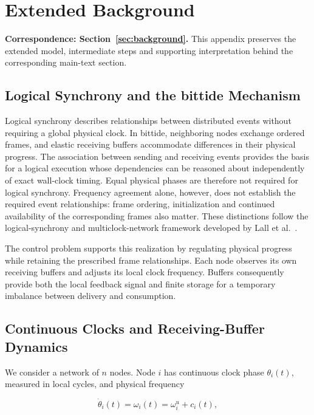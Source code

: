 \section{Extended Background}
\label{app:background}
\noindent\textbf{Correspondence: Section~\ref{sec:background}.} This appendix preserves the extended model, intermediate steps and supporting interpretation behind the corresponding main-text section.


\label{detail:sec:background}

\subsection{Logical Synchrony and the bittide Mechanism}

Logical synchrony describes relationships between distributed events without requiring a global physical clock. In bittide, neighboring nodes exchange ordered frames, and elastic receiving buffers accommodate differences in their physical progress. The association between sending and receiving events provides the basis for a logical execution whose dependencies can be reasoned about independently of exact wall-clock timing. Equal physical phases are therefore not required for logical synchrony. Frequency agreement alone, however, does not establish the required event relationships: frame ordering, initialization and continued availability of the corresponding frames also matter. These distinctions follow the logical-synchrony and multiclock-network framework developed by Lall et al.~\cite{lall2024logicalSynchrony}.

The control problem supports this realization by regulating physical progress while retaining the prescribed frame relationships. Each node observes its own receiving buffers and adjusts its local clock frequency. Buffers consequently provide both the local feedback signal and finite storage for a temporary imbalance between delivery and consumption.

\subsection{Continuous Clocks and Receiving-Buffer Dynamics}

We consider a network of $n$ nodes. Node $i$ has continuous clock phase $\theta_i(t)$, measured in local cycles, and physical frequency

\begin{equation}
\dot\theta_i(t)=\omega_i(t)=\omega_i^u+c_i(t),
\end{equation}

